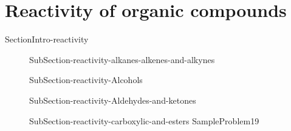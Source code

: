 \documentclass[main.tex]{subfiles}
\newcommand\chapterlabel{Ch-orgo}\setcounter{figurenewcounter}{0}\setcounter{tablenewcounter}{0}\setcounter{formulanewcounter}{0}
\begin{document}
{ 
\section{Reactivity of organic compounds}{SectionIntro-reactivity}
\sloppy\begin{description}
\item[] {SubSection-reactivity-alkanes-alkenes-and-alkynes}
\item[] {SubSection-reactivity-Alcohols}
 \item[] {SubSection-reactivity-Aldehydes-and-ketones}
 \item[] {SubSection-reactivity-carboxylic-and-esters}
  {SampleProblem19}
 \end{description}
 
 }
 
 
\checkoddpage\ifoddpage \clearpage\thispagestyle{empty}\mbox{}\clearpage \else  \fi 
\end{document}
